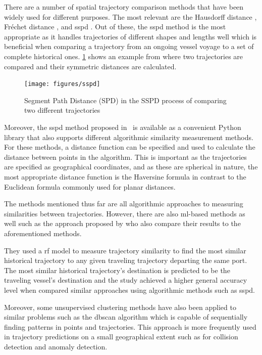 There are a number of spatial trajectory comparison methods that have been widely used for different purposes. The most relevant are the Hausdorff distance \parencite{magdy2015}, Fréchet distance \parencite{magdy2015}, and \acrfull{sspd} \parencite{besse2015review}. Out of these, the \acrshort{sspd} method is the most appropriate as it handles trajectories of different shapes and lengths well which is beneficial when comparing a trajectory from an ongoing vessel voyage to a set of complete historical ones. \cref{fig:sspd} shows an example from \cite{besse2015review} where two trajectories are compared and their symmetric distances are calculated.

\begin{figure}[htbp]  %
    \centering
    \texttt{[image: figures/sspd]}
    \caption{Segment Path Distance (SPD) in the SSPD process of comparing two different trajectories \parencite{besse2015review}}
    \label{fig:sspd}
\end{figure}

Moreover, the \acrshort{sspd} method proposed in~\cite{besse2015review} is available as a convenient Python library that also supports different algorithmic similarity measurement methods. For these methods, a distance function can be specified and used to calculate the distance between points in the algorithm. This is important as the trajectories are specified as geographical coordinates, and as these are spherical in nature, the most appropriate distance function is the Haversine \parencite{haversine} formula in contrast to the Euclidean formula commonly used for planar distances.

The methods mentioned thus far are all algorithmic approaches to measuring similarities between trajectories. However, there are also \acrshort{ml}-based methods as well such as the approach proposed by \cite{Zhang2020AISApproach} who also compare their results to the aforementioned methods.

They used a \acrfull{rf} model to measure trajectory similarity to find the most similar historical trajectory to any given traveling trajectory departing the same port. The most similar historical trajectory's destination is predicted to be the traveling vessel's destination and the study achieved a higher general accuracy level when compared similar approaches using algorithmic methods such as \acrshort{sspd}.

Moreover, some unsupervised clustering methods have also been applied to similar problems such as the \acrfull{dbscan} algorithm \parencite{dbscan} which is capable of sequentially finding patterns in points and trajectories. This approach is more frequently used in trajectory predictions on a small geographical extent such as for collision detection and anomaly detection.

